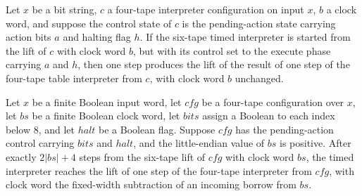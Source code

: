 \begin{lemma}
\label{Turing.timed_execute}
\leanok
{}
Let $x$ be a bit string, $c$ a four-tape interpreter configuration on input $x$, $b$ a
clock word, and suppose the control state of $c$ is the pending-action state carrying
action bits $a$ and halting flag $h$. If the six-tape timed interpreter is started from
the lift of $c$ with clock word $b$, but with its control set to the execute phase
carrying $a$ and $h$, then one step produces the lift of the result of one step of the
four-tape table interpreter from $c$, with clock word $b$ unchanged.
\end{lemma}

\begin{lemma}
\label{Turing.timed_clock_success}
\leanok
{}
Let $x$ be a finite Boolean input word, let $cfg$ be a four-tape configuration over $x$,
let $bs$ be a finite Boolean clock word, let $bits$ assign a Boolean to each index below
$8$, and let $halt$ be a Boolean flag. Suppose $cfg$ has the pending-action control
carrying $bits$ and $halt$, and the little-endian value of $bs$ is positive. After
exactly $2|bs|+4$ steps from the six-tape lift of $cfg$ with clock word $bs$, the timed
interpreter reaches the lift of one step of the four-tape interpreter from $cfg$, with
clock word the fixed-width subtraction of an incoming borrow from $bs$.
\end{lemma}

